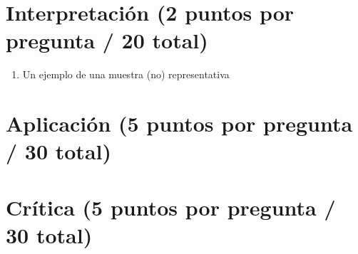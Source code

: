 \documentclass[
]{article}
\providecommand{\tightlist}{%
  \setlength{\itemsep}{0pt}\setlength{\parskip}{0pt}}
\begin{document}
\hypertarget{interpretaciuxf3n-2-puntos-por-pregunta-20-total}{%
\section{Interpretación (2 puntos por pregunta / 20
total)}\label{interpretaciuxf3n-2-puntos-por-pregunta-20-total}}

\begin{enumerate}
\def\labelenumi{\arabic{enumi}.}
\tightlist
\item
  Un ejemplo de una muestra (no) representativa
\end{enumerate}

\hypertarget{aplicaciuxf3n-5-puntos-por-pregunta-30-total}{%
\section{Aplicación (5 puntos por pregunta / 30
total)}\label{aplicaciuxf3n-5-puntos-por-pregunta-30-total}}

\hypertarget{cruxedtica-5-puntos-por-pregunta-30-total}{%
\section{Crítica (5 puntos por pregunta / 30
total)}\label{cruxedtica-5-puntos-por-pregunta-30-total}}
\end{document}
